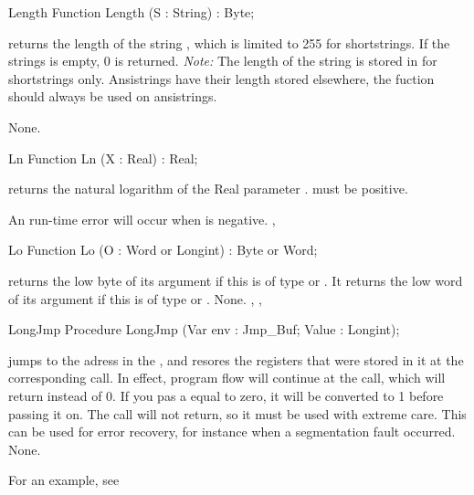 \documentclass{report}
\begin{document}

\begin{function}{Length}
\Declaration
Function Length (S : String) : Byte;

\Description
{} returns the length of the string , which is limited 
to 255 for shortstrings. If the strings  is empty, 0 is returned.
{\em Note:} The length of the string  is stored in  for
shortstrings only. Ansistrings have their length stored elsewhere,
the  fuction should always be used on ansistrings.

\Errors
None.
\SeeAlso
{}
\end{function}


\begin{function}{Ln}
\Declaration
Function Ln (X : Real) : Real;

\Description

 returns the natural logarithm of the Real parameter .
 must be positive.

\Errors
An run-time error will occur when  is negative.
\SeeAlso
{}, 
\end{function}


\begin{function}{Lo}
\Declaration
Function Lo (O : Word or Longint) : Byte or Word;

\Description
{} returns the low byte of its argument if this is of type
 or
. It returns the low word of its argument if this is of type
 or .
\Errors
None.
\SeeAlso
{}, , 
\end{function}


\begin{procedure}{LongJmp}
\Declaration
Procedure LongJmp (Var env : Jmp\_Buf; Value : Longint);

\Description

 jumps to the adress in the  ,
and resores the registers that were stored in it at the corresponding
 call.
In effect, program flow will continue at the  call, which will
return  instead of 0. If you pas a  equal to zero, it will be
converted to 1 before passing it on. The call will not return, so it must be
used with extreme care.
This can be used for error recovery, for instance when a segmentation fault
occurred.
\Errors
None.
\SeeAlso
{}
\end{procedure}
For an example, see 
\end{document}
